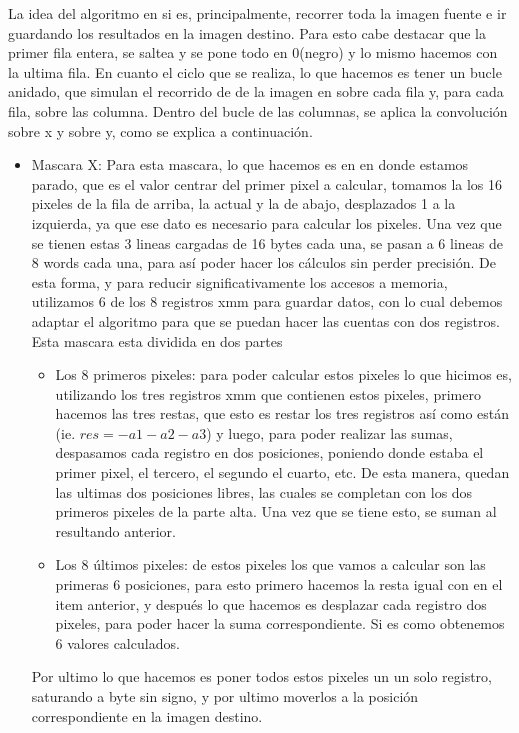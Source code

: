 La idea del algoritmo en si es, principalmente, recorrer toda la imagen fuente e ir guardando los resultados en la imagen destino. Para esto cabe destacar que la primer fila entera, se saltea y se pone todo en 0(negro) y lo mismo hacemos con la ultima fila. En cuanto el ciclo que se realiza, lo que hacemos es tener un bucle anidado, que simulan el recorrido de de la imagen en sobre cada fila y, para cada fila, sobre las columna.
Dentro del bucle de las columnas, se aplica la convolución sobre x y sobre y, como se explica a continuación.

\begin{itemize}
\item Mascara X: Para esta mascara, lo que hacemos es en en donde estamos parado, que es el valor centrar del primer pixel a calcular, tomamos la los 16 pixeles de la fila de arriba, la actual y la de abajo, desplazados 1 a la izquierda, ya que ese dato es necesario para calcular los pixeles. Una vez que se tienen estas 3 lineas cargadas de 16 bytes cada una, se pasan a 6 lineas de 8 words cada una, para así poder hacer los cálculos sin perder precisión. De esta forma, y  para reducir significativamente los accesos a memoria, utilizamos 6 de los 8 registros xmm para guardar datos, con lo cual debemos adaptar el algoritmo para que se puedan hacer las cuentas con dos registros. Esta mascara esta dividida en dos partes
  \begin{itemize}
    \item Los 8 primeros pixeles: para poder calcular estos pixeles lo que hicimos es, utilizando los tres registros xmm que contienen estos pixeles, primero hacemos las tres restas, que esto es restar los tres registros así como están (ie. $res=-a1-a2-a3$) y luego, para poder realizar las sumas, despasamos cada registro en dos posiciones, poniendo donde estaba el primer pixel, el tercero, el segundo el cuarto, etc.
    De esta manera, quedan las ultimas dos posiciones libres, las cuales se completan con los dos primeros pixeles de la parte alta. Una vez que se tiene esto, se suman al resultando anterior. 
    \item Los 8 últimos pixeles: de estos pixeles los que vamos a calcular son las primeras 6 posiciones, para esto primero hacemos la resta igual con en el item anterior, y después lo que hacemos es desplazar cada registro dos pixeles, para poder hacer la suma correspondiente. Si es como obtenemos 6 valores calculados. 
  \end{itemize}
Por ultimo lo que hacemos es poner todos estos pixeles un un solo registro, saturando a byte sin signo, y por ultimo moverlos a la posición correspondiente en la imagen destino.

\end{itemize}
